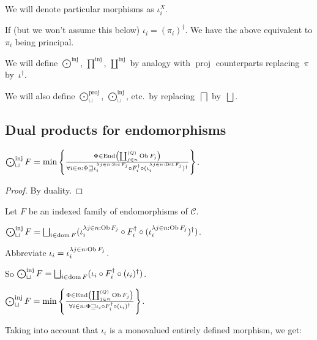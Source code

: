 We will denote particular morphisms as $\iota_i^X$.

If (but we won't assume this below) $\iota_i =
(\pi_i)^{\dagger}$. We have the above equivalent to $\pi_i$ being principal.

We will define $\bigodot^{\operatorname{inj}}$, $\prod^{\operatorname{inj}}$, $\coprod^{\operatorname{inj}}$
by analogy with $\operatorname{proj}$ counterparts replacing~$\pi$ by~$\iota^{\dagger}$.

We will also define $\bigodot^{\operatorname{proj}}_{\sqcup}$, $\bigodot^{\operatorname{inj}}_{\sqcup}$, etc.\ by replacing~$\bigsqcap$ by~$\bigsqcup$.

\subsection{Dual products for endomorphisms}

\begin{prop}
  $\bigodot^{\operatorname{inj}}_{\sqcup} F = \min \left\{ \frac{ \Phi \in \operatorname{End} \left( \coprod^{(Q)}_{j
  \in n} \operatorname{Ob} F_j \right) }{ \forall i \in n :
  \Phi \sqsupseteq \iota^{\lambda j \in n : \operatorname{Src} F_j}_i \circ
  F_i^{\dagger} \circ (\iota^{\lambda j \in n : \operatorname{Dst} F_j}_i)^{\dagger} }\right\}$.
\end{prop}

\begin{proof}
  By duality.
\end{proof}

Let $F$ be an indexed family of endomorphisms of $\mathcal{C}$.

\begin{defn}
  $\bigodot^{\operatorname{inj}}_{\sqcup} F = \bigsqcup_{i \in \dom F} (\iota^{\lambda j \in n :
  \Ob F_j}_i \circ F_i^{\dagger} \circ (\iota^{\lambda j \in n :
  \Ob F_j}_i)^{\dagger})$.
\end{defn}

Abbreviate $\iota_i = \iota^{\lambda j \in n : \operatorname{Ob} F_j}_i$.

So $\bigodot^{\operatorname{inj}}_{\sqcup} F = \bigsqcup_{i \in \dom F} (\iota_i \circ F_i^{\dagger}
\circ (\iota_i)^{\dagger})$.

$\bigodot^{\operatorname{inj}}_{\sqcup} F = \min \left\{ \frac{ \Phi \in \operatorname{End} \left( \coprod^{(Q)}_{j \in n}
\operatorname{Ob} F_j \right) }{ \forall i \in n : \Phi
\sqsupseteq \iota_i \circ F_i^{\dagger} \circ (\iota_i)^{\dagger} }\right\}$.

Taking into account that $\iota_i$ is a monovalued entirely defined morphism,
we get:

